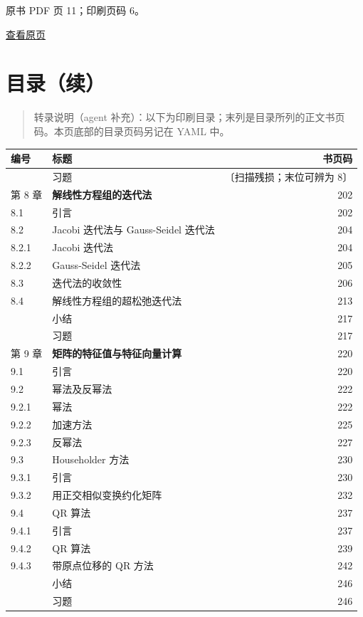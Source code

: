 \clearpage

原书 PDF 页 11；印刷页码 6。

\href{source-images/pdf-011.jpeg}{查看原页}

\section{目录（续）}\label{front-ux76eeux5f55ux7eed-4}

\begin{quote}
转录说明（agent 补充）：以下为印刷目录；末列是目录所列的正文书页码。本页底部的目录页码另记在 YAML 中。
\end{quote}

{\def\LTcaptype{none} %
\begin{longtable}[]{@{}llr@{}}
\toprule\noalign{}
编号 & 标题 & 书页码 \\
\midrule\noalign{}
\endhead
\bottomrule\noalign{}
\endlastfoot
& 习题 & 〔扫描残损；末位可辨为 8〕 \\
第 8 章 & \textbf{解线性方程组的迭代法} & 202 \\
8.1 & 引言 & 202 \\
8.2 & Jacobi 迭代法与 Gauss-Seidel 迭代法 & 204 \\
8.2.1 & Jacobi 迭代法 & 204 \\
8.2.2 & Gauss-Seidel 迭代法 & 205 \\
8.3 & 迭代法的收敛性 & 206 \\
8.4 & 解线性方程组的超松弛迭代法 & 213 \\
& 小结 & 217 \\
& 习题 & 217 \\
第 9 章 & \textbf{矩阵的特征值与特征向量计算} & 220 \\
9.1 & 引言 & 220 \\
9.2 & 幂法及反幂法 & 222 \\
9.2.1 & 幂法 & 222 \\
9.2.2 & 加速方法 & 225 \\
9.2.3 & 反幂法 & 227 \\
9.3 & Householder 方法 & 230 \\
9.3.1 & 引言 & 230 \\
9.3.2 & 用正交相似变换约化矩阵 & 232 \\
9.4 & QR 算法 & 237 \\
9.4.1 & 引言 & 237 \\
9.4.2 & QR 算法 & 239 \\
9.4.3 & 带原点位移的 QR 方法 & 242 \\
& 小结 & 246 \\
& 习题 & 246 \\
\end{longtable}
}

